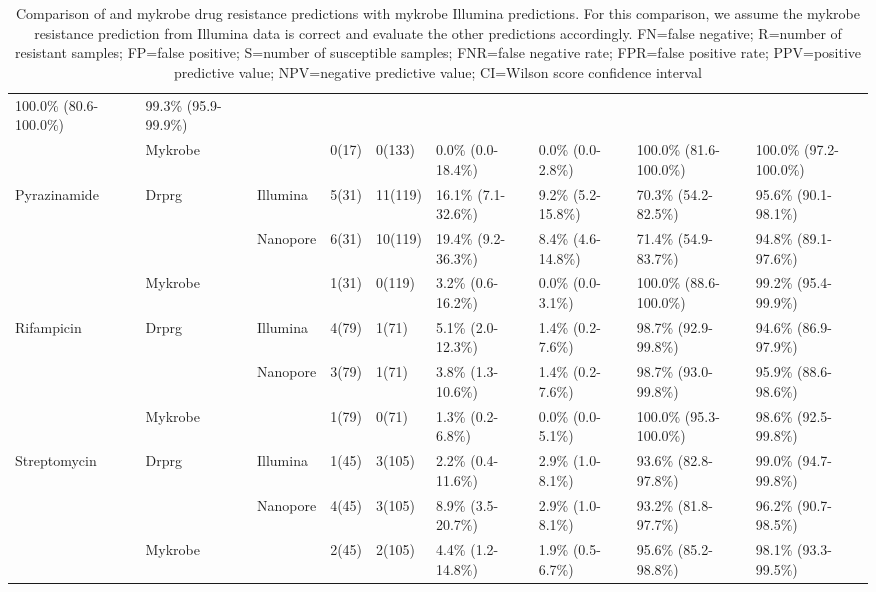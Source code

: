 \begin{table}
{\begin{tabular}{|l|l|l|l|l|l|l|l|l|}
  100.0\% (80.6-100.0\%) &
  99.3\% (95.9-99.9\%) \\ \cline{2-2} \cline{4-9} 
 &
  Mykrobe &
   &
  0(17) &
  0(133) &
  0.0\% (0.0-18.4\%) &
  0.0\% (0.0-2.8\%) &
  100.0\% (81.6-100.0\%) &
  100.0\% (97.2-100.0\%) \\ \hline
\multirow{3}{*}{Pyrazinamide} &
  \multirow{2}{*}{Drprg} &
  Illumina &
  5(31) &
  11(119) &
  16.1\% (7.1-32.6\%) &
  9.2\% (5.2-15.8\%) &
  70.3\% (54.2-82.5\%) &
  95.6\% (90.1-98.1\%) \\ \cline{3-9} 
 &
   &
  \multirow{2}{*}{Nanopore} &
  6(31) &
  10(119) &
  19.4\% (9.2-36.3\%) &
  8.4\% (4.6-14.8\%) &
  71.4\% (54.9-83.7\%) &
  94.8\% (89.1-97.6\%) \\ \cline{2-2} \cline{4-9} 
 &
  Mykrobe &
   &
  1(31) &
  0(119) &
  3.2\% (0.6-16.2\%) &
  0.0\% (0.0-3.1\%) &
  100.0\% (88.6-100.0\%) &
  99.2\% (95.4-99.9\%) \\ \hline
\multirow{3}{*}{Rifampicin} &
  \multirow{2}{*}{Drprg} &
  Illumina &
  4(79) &
  1(71) &
  5.1\% (2.0-12.3\%) &
  1.4\% (0.2-7.6\%) &
  98.7\% (92.9-99.8\%) &
  94.6\% (86.9-97.9\%) \\ \cline{3-9} 
 &
   &
  \multirow{2}{*}{Nanopore} &
  3(79) &
  1(71) &
  3.8\% (1.3-10.6\%) &
  1.4\% (0.2-7.6\%) &
  98.7\% (93.0-99.8\%) &
  95.9\% (88.6-98.6\%) \\ \cline{2-2} \cline{4-9} 
 &
  Mykrobe &
   &
  1(79) &
  0(71) &
  1.3\% (0.2-6.8\%) &
  0.0\% (0.0-5.1\%) &
  100.0\% (95.3-100.0\%) &
  98.6\% (92.5-99.8\%) \\ \hline
\multirow{3}{*}{Streptomycin} &
  \multirow{2}{*}{Drprg} &
  Illumina &
  1(45) &
  3(105) &
  2.2\% (0.4-11.6\%) &
  2.9\% (1.0-8.1\%) &
  93.6\% (82.8-97.8\%) &
  99.0\% (94.7-99.8\%) \\ \cline{3-9} 
 &
   &
  \multirow{2}{*}{Nanopore} &
  4(45) &
  3(105) &
  8.9\% (3.5-20.7\%) &
  2.9\% (1.0-8.1\%) &
  93.2\% (81.8-97.7\%) &
  96.2\% (90.7-98.5\%) \\ \cline{2-2} \cline{4-9} 
 &
  Mykrobe &
   &
  2(45) &
  2(105) &
  4.4\% (1.2-14.8\%) &
  1.9\% (0.5-6.7\%) &
  95.6\% (85.2-98.8\%) &
  98.1\% (93.3-99.5\%) \\ \hline
\end{tabular}%
}
\caption{Comparison of \drprg{} and mykrobe \ont{} drug resistance predictions with mykrobe Illumina predictions. For this comparison, we assume the mykrobe resistance prediction from Illumina data is correct and evaluate the other predictions accordingly. FN=false negative; R=number of resistant samples; FP=false positive; S=number of susceptible samples; FNR=false negative rate; FPR=false positive rate; PPV=positive predictive value; NPV=negative predictive value; CI=Wilson score confidence interval}
\label{tab:geno-concordance}
\end{table}

